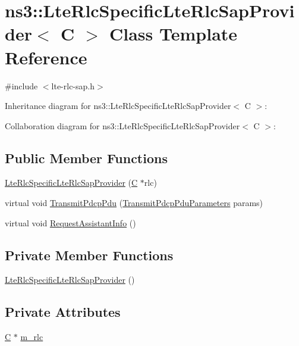 \hypertarget{classns3_1_1LteRlcSpecificLteRlcSapProvider}{}\section{ns3\+:\+:Lte\+Rlc\+Specific\+Lte\+Rlc\+Sap\+Provider$<$ C $>$ Class Template Reference}
\label{classns3_1_1LteRlcSpecificLteRlcSapProvider}


{\ttfamily \#include $<$lte-\/rlc-\/sap.\+h$>$}



Inheritance diagram for ns3\+:\+:Lte\+Rlc\+Specific\+Lte\+Rlc\+Sap\+Provider$<$ C $>$\+:


Collaboration diagram for ns3\+:\+:Lte\+Rlc\+Specific\+Lte\+Rlc\+Sap\+Provider$<$ C $>$\+:
\subsection*{Public Member Functions}
\begin{DoxyCompactItemize}
\item 
\hyperlink{classns3_1_1LteRlcSpecificLteRlcSapProvider_a23078975a44d8eac6c748562e780c284}{Lte\+Rlc\+Specific\+Lte\+Rlc\+Sap\+Provider} (\hyperlink{loss__COST231__small__cities__urban_8m_aaa53ca0b650dfd85c4f59fa156f7a2cc}{C} $\ast$rlc)
\item 
virtual void \hyperlink{classns3_1_1LteRlcSpecificLteRlcSapProvider_a2d09dc7a881d9ebb5a5b12aba8fdf420}{Transmit\+Pdcp\+Pdu} (\hyperlink{structns3_1_1LteRlcSapProvider_1_1TransmitPdcpPduParameters}{Transmit\+Pdcp\+Pdu\+Parameters} params)
\item 
virtual void \hyperlink{classns3_1_1LteRlcSpecificLteRlcSapProvider_a02b508611699d263bde6c14cfcc9ff55}{Request\+Assistant\+Info} ()
\end{DoxyCompactItemize}
\subsection*{Private Member Functions}
\begin{DoxyCompactItemize}
\item 
\hyperlink{classns3_1_1LteRlcSpecificLteRlcSapProvider_ac746bd8b286ace74975533088569dd6e}{Lte\+Rlc\+Specific\+Lte\+Rlc\+Sap\+Provider} ()
\end{DoxyCompactItemize}
\subsection*{Private Attributes}
\begin{DoxyCompactItemize}
\item 
\hyperlink{loss__COST231__small__cities__urban_8m_aaa53ca0b650dfd85c4f59fa156f7a2cc}{C} $\ast$ \hyperlink{classns3_1_1LteRlcSpecificLteRlcSapProvider_af7d99e562fa45aa3cbd5501236ccf919}{m\+\_\+rlc}
\end{DoxyCompactItemize}


